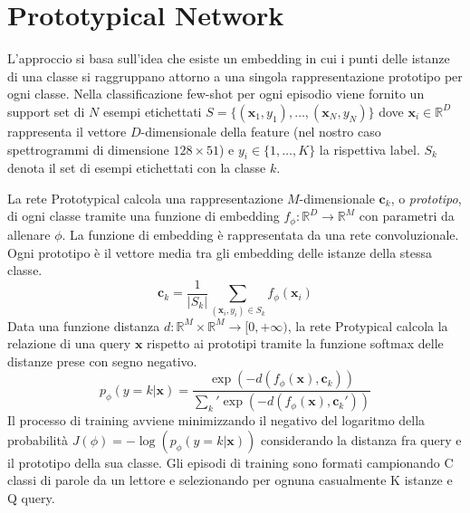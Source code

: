 \documentclass[12pt,a4paper,titlepage]{article}
\begin{document}
\section{Prototypical Network}
L'approccio si basa sull'idea che esiste un embedding in cui i punti delle istanze di una classe si raggruppano attorno a una singola rappresentazione prototipo per ogni classe.
Nella classificazione few-shot per ogni episodio viene fornito un support set di $N$ esempi etichettati  $S=\{(\mathbf{x}_1,y_1), \dots,(\mathbf{x}_N,y_N)\}$ dove $\mathbf{x}_i\in \mathbb{R}^D$ rappresenta il vettore $D$-dimensionale della feature (nel nostro caso spettrogrammi di dimensione $128 \times 51$) e $y_i \in \{1, \dots, K\}$ la rispettiva label. $S_k$ denota il set di esempi etichettati con la classe $k$.

La rete Prototypical calcola una rappresentazione $M$-dimensionale $\mathbf{c}_k$, o \emph{prototipo}, di ogni classe tramite una funzione di embedding $f_\phi : \mathbb{R}^D \rightarrow \mathbb{R}^M$ con parametri da allenare $\phi$. La funzione di embedding è rappresentata da una rete convoluzionale. Ogni prototipo è il vettore media tra gli embedding delle istanze della stessa classe.
\begin{equation}
	\mathbf{c}_k=\frac{1}{|S_k|}\sum_{(\mathbf{x}_i,y_i)\in S_k}f_\phi (\mathbf{x}_i)
\end{equation}
Data una funzione distanza $d: \mathbb{R}^M \times \mathbb{R}^M \rightarrow [0, +\infty )$, la rete Protypical calcola la relazione di una query $\mathbf{x}$ rispetto ai prototipi tramite la funzione softmax delle distanze prese con segno negativo.
\begin{equation}
p_\phi(y=k|\mathbf{x})=\dfrac{\exp(-d(f_\phi(\mathbf{x}),\mathbf{c}_k))}{\sum_k' \exp(-d(f_\phi(\mathbf{x}),\mathbf{c}_k'))}
\end{equation}
Il processo di training avviene minimizzando il negativo del logaritmo della probabilità $J(\phi)=-\log\left(p_\phi(y=k|\mathbf{x})\right)$ considerando la distanza fra query e il prototipo della sua classe.
Gli episodi di training sono formati campionando C classi di parole da un lettore e selezionando per ognuna casualmente K istanze e Q query.
\end{document}
